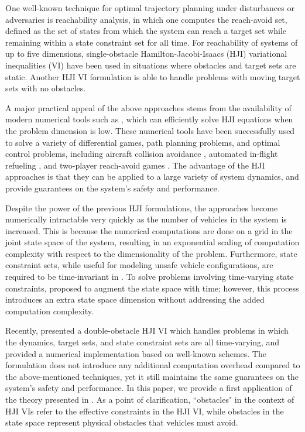 \documentclass[letterpaper, 10pt, conference]{ieeeconf}      %
\begin{document}
One well-known technique for optimal trajectory planning under disturbances or adversaries is reachability analysis, in which one computes the reach-avoid set, defined as the set of states from which the system can reach a target set while remaining within a state constraint set for all time. For reachability of systems of up to five dimensions, single-obstacle Hamilton-Jacobi-Isaacs (HJI) variational inequalities (VI) \cite{mitchell05,bokanowski10} have been used in situations where obstacles and target sets are static. Another HJI VI formulation \cite{barron89} is able to handle problems with moving target sets with no obstacles. 

A major practical appeal of the above approaches stems from the availability of modern numerical tools such as \cite{mitchell05, sethian96, osher02, LSToolbox}, which can efficiently solve HJI equations when the problem dimension is low. These numerical tools have been successfully used to solve a variety of differential games, path planning problems, and optimal control problems, including aircraft collision avoidance \cite{mitchell05}, automated in-flight refueling \cite{ding08}, and two-player reach-avoid games \cite{huang11}. The advantage of the HJI approaches is that they can be applied to a large variety of system dynamics, and provide guarantees on the system's safety and performance.

Despite the power of the previous HJI formulations, the approaches become numerically intractable very quickly as the number of vehicles in the system is increased. This is because the numerical computations are done on a grid in the joint state space of the system, resulting in an exponential scaling of computation complexity with respect to the dimensionality of the problem. Furthermore, state constraint sets, while useful for modeling unsafe vehicle configurations, are required to be time-invariant in \cite{mitchell05, bokanowski10, mitchell-thesis}. To solve problems involving time-varying state constraints, \cite{bokanowski11} proposed to augment the state space with time; however, this process introduces an extra state space dimension without addressing the added computation complexity.

Recently, \cite{fisac15} presented a double-obstacle HJI VI which handles problems in which the dynamics, target sets, and state constraint sets are all time-varying, and provided a numerical implementation based on well-known schemes. The formulation does not introduce any additional computation overhead compared to the above-mentioned techniques, yet it still maintains the same guarantees on the system's safety and performance. In this paper, we provide a first application of the theory presented in \cite{fisac15}. As a point of clarification, ``obstacles" in the context of HJI VIs refer to the effective constraints in the HJI VI, while obstacles in the state space represent physical obstacles that vehicles must avoid.
\end{document}
